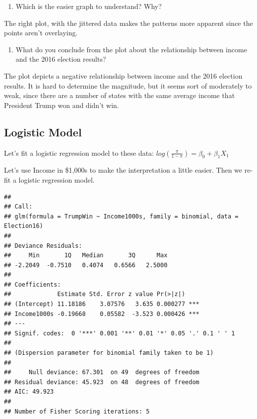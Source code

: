 \documentclass[]{article}
\newenvironment{Shaded}{\begin{snugshade}}{\end{snugshade}}
\newcommand{\DataTypeTok}[1]{\textcolor[rgb]{0.13,0.29,0.53}{#1}}
\newcommand{\DecValTok}[1]{\textcolor[rgb]{0.00,0.00,0.81}{#1}}
\newcommand{\KeywordTok}[1]{\textcolor[rgb]{0.13,0.29,0.53}{\textbf{#1}}}
\newcommand{\NormalTok}[1]{#1}
\newcommand{\OperatorTok}[1]{\textcolor[rgb]{0.81,0.36,0.00}{\textbf{#1}}}
\newcommand{\StringTok}[1]{\textcolor[rgb]{0.31,0.60,0.02}{#1}}
\providecommand{\tightlist}{%
  \setlength{\itemsep}{0pt}\setlength{\parskip}{0pt}}
\begin{document}
\begin{enumerate}
\def\labelenumi{\arabic{enumi}.}
\tightlist
\item
  Which is the easier graph to understand? Why?
\end{enumerate}

The right plot, with the jittered data makes the patterns more apparent
since the points aren't overlaying.

\begin{enumerate}
\def\labelenumi{\arabic{enumi}.}
\setcounter{enumi}{1}
\tightlist
\item
  What do you conclude from the plot about the relationship between
  income and the 2016 election results?
\end{enumerate}

The plot depicts a negative relationship between income and the 2016
election results. It is hard to determine the magnitude, but it seems
sort of moderately to weak, since there are a number of states with the
same average income that President Trump won and didn't win.

\hypertarget{logistic-model}{%
\subsection{Logistic Model}\label{logistic-model}}

Let's fit a logistic regression model to these data:
\(log(\frac{\pi}{1-\pi}) = \beta_0+\beta_1 X_1\)

Let's use Income in \$1,000s to make the interpretation a little easier.
Then we re-fit a logistic regression model.

\begin{Shaded}
\end{Shaded}

\begin{verbatim}
## 
## Call:
## glm(formula = TrumpWin ~ Income1000s, family = binomial, data = Election16)
## 
## Deviance Residuals: 
##     Min       1Q   Median       3Q      Max  
## -2.2049  -0.7510   0.4074   0.6566   2.5000  
## 
## Coefficients:
##             Estimate Std. Error z value Pr(>|z|)    
## (Intercept) 11.18186    3.07576   3.635 0.000277 ***
## Income1000s -0.19668    0.05582  -3.523 0.000426 ***
## ---
## Signif. codes:  0 '***' 0.001 '**' 0.01 '*' 0.05 '.' 0.1 ' ' 1
## 
## (Dispersion parameter for binomial family taken to be 1)
## 
##     Null deviance: 67.301  on 49  degrees of freedom
## Residual deviance: 45.923  on 48  degrees of freedom
## AIC: 49.923
## 
## Number of Fisher Scoring iterations: 5
\end{verbatim}
\end{document}
